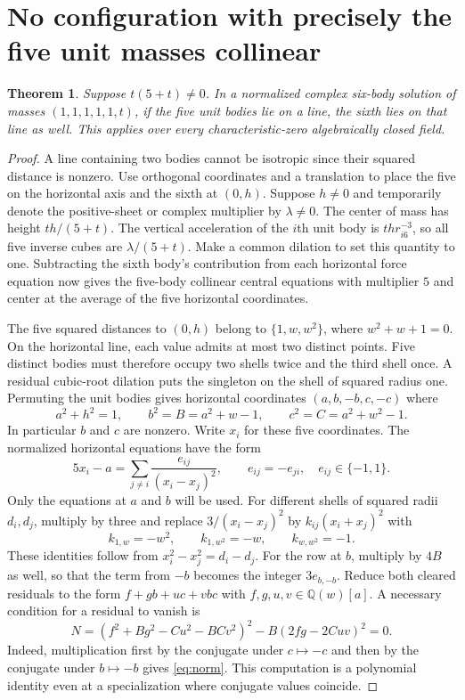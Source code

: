 \documentclass[11pt]{article}
\newtheorem{theorem}{Theorem}\newtheorem{corollary}[theorem]{Corollary}\newtheorem{lemma}[theorem]{Lemma}
\begin{document}
\section{No configuration with precisely the five unit masses collinear}
\begin{theorem}\label{th:five}
Suppose $t(5+t)\ne0$. In a normalized complex six-body solution of masses $(1,1,1,1,1,t)$, if the five unit bodies lie on a line, the sixth lies on that line as well. This applies over every characteristic-zero algebraically closed field.
\end{theorem}
\begin{proof}
A line containing two bodies cannot be isotropic since their squared distance is nonzero. Use orthogonal coordinates and a translation to place the five on the horizontal axis and the sixth at $(0,h)$. Suppose $h\ne0$ and temporarily denote the positive-sheet or complex multiplier by $\lambda\ne0$. The center of mass has height $th/(5+t)$. The vertical acceleration of the $i$th unit body is $t h r_{i6}^{-3}$, so all five inverse cubes are $\lambda/(5+t)$. Make a common dilation to set this quantity to one. Subtracting the sixth body's contribution from each horizontal force equation now gives the five-body collinear central equations with multiplier $5$ and center at the average of the five horizontal coordinates.

The five squared distances to $(0,h)$ belong to $\{1,w,w^2\}$, where $w^2+w+1=0$. On the horizontal line, each value admits at most two distinct points. Five distinct bodies must therefore occupy two shells twice and the third shell once. A residual cubic-root dilation puts the singleton on the shell of squared radius one. Permuting the unit bodies gives horizontal coordinates $(a,b,-b,c,-c)$ where
\begin{equation}\label{eq:shell}
 a^2+h^2=1,\qquad b^2=B=a^2+w-1,\qquad c^2=C=a^2+w^2-1.
\end{equation}
In particular $b$ and $c$ are nonzero. Write $x_i$ for these five coordinates. The normalized horizontal equations have the form
\begin{equation}\label{eq:axial}
 5x_i-a=\sum_{j\ne i}\frac{e_{ij}}{(x_i-x_j)^2},\qquad e_{ij}=-e_{ji},\quad e_{ij}\in\{-1,1\}.
\end{equation}
Only the equations at $a$ and $b$ will be used. For different shells of squared radii $d_i,d_j$, multiply by three and replace $3/(x_i-x_j)^2$ by $k_{ij}(x_i+x_j)^2$ with
\[
 k_{1,w}=-w^2,\qquad k_{1,w^2}=-w,\qquad k_{w,w^2}=-1.
\]
These identities follow from $x_i^2-x_j^2=d_i-d_j$. For the row at $b$, multiply by $4B$ as well, so that the term from $-b$ becomes the integer $3e_{b,-b}$. Reduce both cleared residuals to the form $f+gb+uc+vbc$ with $f,g,u,v\in\mathbb Q(w)[a]$. A necessary condition for a residual to vanish is
\begin{equation}\label{eq:norm}
 N=(f^2+Bg^2-Cu^2-BCv^2)^2-B(2fg-2Cuv)^2=0 .
\end{equation}
Indeed, multiplication first by the conjugate under $c\mapsto-c$ and then by the conjugate under $b\mapsto-b$ gives \eqref{eq:norm}. This computation is a polynomial identity even at a specialization where conjugate values coincide.


\end{proof}
\end{document}
